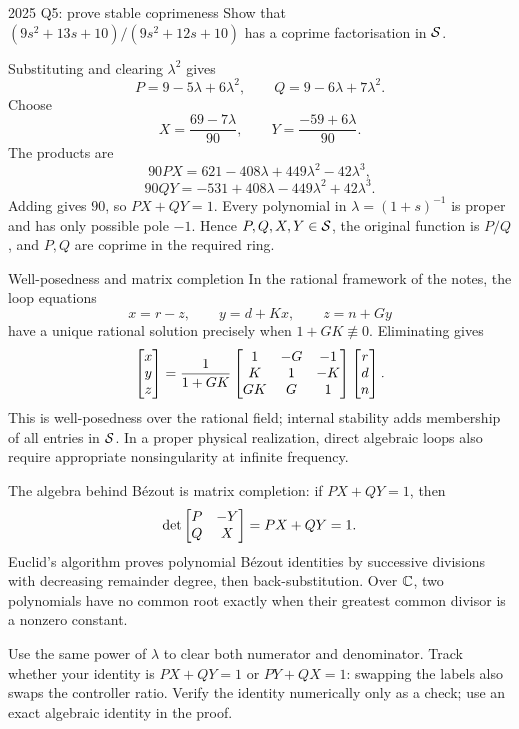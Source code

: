 \begin{question}{2025 Q5: prove stable coprimeness}
Show that $(9s^2+13s+10)/(9s^2+12s+10)$ has a coprime factorisation in $\mathcal S$.
\end{question}
\begin{answer}
Substituting and clearing $\lambda^2$ gives
\[P=9-5\lambda+6\lambda^2,\qquad Q=9-6\lambda+7\lambda^2.\]
Choose
\[X=\frac{69-7\lambda}{90},\qquad Y=\frac{-59+6\lambda}{90}.\]
The products are
\[90PX=621-408\lambda+449\lambda^2-42\lambda^3,\]
\[90QY=-531+408\lambda-449\lambda^2+42\lambda^3.\]
Adding gives $90$, so $PX+QY=1$. Every polynomial in $\lambda=(1+s)^{-1}$ is proper and has only possible pole $-1$. Hence $P,Q,X,Y\in\mathcal S$, the original function is $P/Q$, and $P,Q$ are coprime in the required ring.
\end{answer}
\begin{concept}{Well-posedness and matrix completion}
In the rational framework of the notes, the loop equations
\[x=r-z,\qquad y=d+Kx,\qquad z=n+Gy\]
have a unique rational solution precisely when $1+GK\not\equiv0$. Eliminating gives
\[\begin{bmatrix}x\\y\\z\end{bmatrix}=\frac1{1+GK}\begin{bmatrix}1&-G&-1\\K&1&-K\\GK&G&1\end{bmatrix}\begin{bmatrix}r\\d\\n\end{bmatrix}.\]
This is well-posedness over the rational field; internal stability adds membership of all entries in $\mathcal S$. In a proper physical realization, direct algebraic loops also require appropriate nonsingularity at infinite frequency.

The algebra behind B\'ezout is matrix completion: if $PX+QY=1$, then
\[\det\begin{bmatrix}P&-Y\\Q&X\end{bmatrix}=PX+QY=1.\]
Euclid's algorithm proves polynomial B\'ezout identities by successive divisions with decreasing remainder degree, then back-substitution. Over $\mathbb C$, two polynomials have no common root exactly when their greatest common divisor is a nonzero constant.
\end{concept}
\begin{tip}
Use the same power of $\lambda$ to clear both numerator and denominator. Track whether your identity is $PX+QY=1$ or $PY+QX=1$: swapping the labels also swaps the controller ratio. Verify the identity numerically only as a check; use an exact algebraic identity in the proof.
\end{tip}

